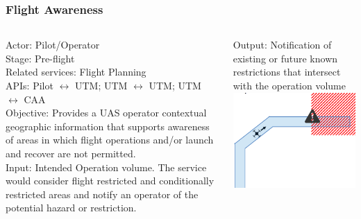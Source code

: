 \documentclass[usenames,dvipsnames,aspectratio=169,serif]{beamer}
\begin{document}
\begin{frame}
\begin{columns}[T]
\begin{column}{0.25\textwidth}
      \end{column}
   \end{columns}
\end{frame}


\begin{frame}
   \frametitle{Flight Awareness}
   \begin{columns}[T]
      \begin{column}{0.65\textwidth}
         Actor: Pilot/Operator \\
         Stage: Pre-flight \\
         Related services: Flight Planning \\
         APIs: Pilot $\leftrightarrow$ UTM; UTM $\leftrightarrow$ UTM; UTM $\leftrightarrow$ CAA \\
         Objective: Provides a UAS operator contextual geographic information that supports awareness of areas in which flight operations and/or launch and recover are not permitted.  \\
         Input: Intended Operation volume. The service would consider flight restricted and conditionally restricted areas and notify an operator of the potential hazard or restriction.
      \end{column}
      \begin{column}{0.35\textwidth}
         Output: Notification of existing or future known restrictions that intersect with the operation volume \\
         \includegraphics[height=0.65\textwidth]{img/flight-awareness.png}
      \end{column}
   \end{columns}
\end{frame}
\end{document}
